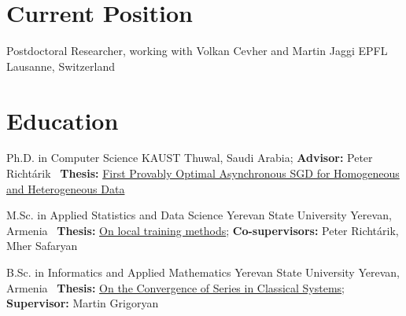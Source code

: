 \documentclass[10pt,a4paper,sans]{moderncv}        %
\newcommand{\peter}{Peter Richtárik}
\newcommand{\mher}{Mher Safaryan}
\newcommand{\grigoryan}{Martin Grigoryan}
\newcommand{\kaust}{KAUST}
\newcommand{\yerevan}{Yerevan, Armenia}
\newcommand{\thuwal}{Thuwal, Saudi Arabia}
\newcommand{\ysu}{Yerevan State University}
\begin{document}
\makecvtitle 


\vspace{-1em}
\section{Current Position}

{Postdoctoral Researcher, working with Volkan Cevher and Martin Jaggi}
{EPFL}
{Lausanne, Switzerland}
{}{}

\vspace{-1em}
\section{Education}

{Ph.D. in Computer Science}
{\kaust}
{\thuwal; \textbf{Advisor:} \peter}{}
{\faFile \ \textbf{Thesis:} \href{https://arxiv.org/abs/2601.02523}{First Provably Optimal Asynchronous SGD for Homogeneous and Heterogeneous Data} }


{M.Sc. in Applied Statistics and Data Science}
{\ysu}
{\yerevan}{}
{\faFile \ \textbf{Thesis:} \href{https://artomaranjyan.github.io/assets/pdf/Master_thesis.pdf}{On local training methods}; \textbf{Co-supervisors:} \peter, \mher}


{B.Sc. in Informatics and Applied Mathematics}
{\ysu}
{\yerevan}{}
{\faFile \ \textbf{Thesis:} \href{https://artomaranjyan.github.io/assets/pdf/Bachelor_thesis.pdf}{On the Convergence of Series in Classical Systems}; \textbf{Supervisor:} \grigoryan}
\end{document}
